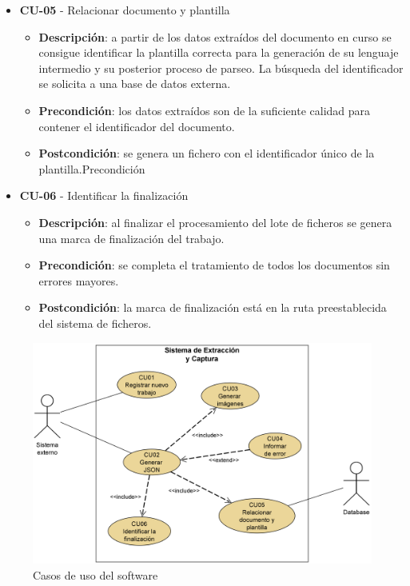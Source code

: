 \begin{itemize}
\begin{itemize}
\end{itemize}
\item \textbf{CU-05} - Relacionar documento y plantilla
	\begin{itemize}
		\item \textbf{Descripción}: a partir de los datos extraídos del documento en curso se consigue identificar la plantilla correcta para la generación de su lenguaje intermedio y su posterior proceso de parseo. La búsqueda del identificador se solicita a una base de datos externa.
		\item \textbf{Precondición}: los datos extraídos son de la suficiente calidad para contener el identificador del documento.
		\item \textbf{Postcondición}: se genera un fichero con el identificador único de la plantilla.Precondición
\end{itemize}
\item \textbf{CU-06} - Identificar la finalización
	\begin{itemize}
		\item \textbf{Descripción}: al finalizar el procesamiento del lote de ficheros se genera una marca de finalización del trabajo.
		\item \textbf{Precondición}: se completa el tratamiento de todos los documentos sin errores mayores.
		\item \textbf{Postcondición}: la marca de finalización está en la ruta preestablecida del sistema de ficheros.
\end{itemize}

\end{itemize}

\begin{figure}[hp!]
	\centering
	\includegraphics[width=1.0\textwidth]{imaxes/g-analisis/casos-uso.png}
	\caption{Casos de uso del software}
	\label{fig:casos-de-uso}
\end{figure}

